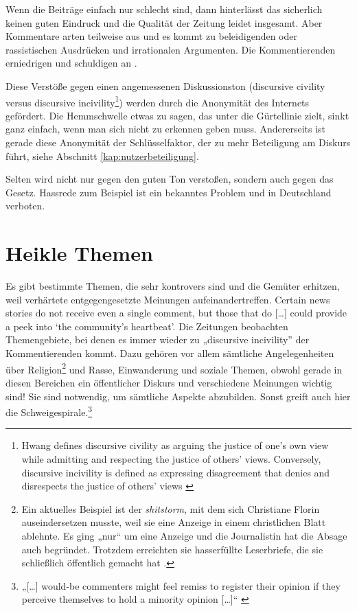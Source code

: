 Wenn die Beiträge einfach nur schlecht sind, dann hinterlässt das sicherlich
keinen guten Eindruck und die Qualität der Zeitung leidet insgesamt. Aber
Kommentare arten teilweise aus und es kommt zu beleidigenden oder rassistischen
Ausdrücken und irrationalen Argumenten. Die Kommentierenden erniedrigen und
schuldigen an \autocite[S.~103]{reich}.

Diese Verstöße gegen einen angemessenen Diskussionston (\glqq discursive
civility\grqq{} versus \glqq discursive incivility\grqq\footnote{Hwang defines
  \glqq discursive civility\grqq{} as arguing the justice of one's own view while
  admitting and respecting the justice of others' views. Conversely,
  \glqq discursive incivility\grqq{} is defined as expressing disagreement that denies
and disrespects the justice of others' views \autocite{hwang}
\autocite[S.~6/7]{santana:2014}}) werden durch die Anonymität des Internets
gefördert. Die Hemmschwelle etwas zu sagen, das unter die Gürtellinie zielt,
sinkt ganz einfach, wenn man sich nicht zu erkennen geben muss. Andererseits ist
gerade diese Anonymität der Schlüsselfaktor, der zu mehr Beteiligung am Diskurs
führt, siehe Abschnitt \ref{kap:nutzerbeteiligung}.

Selten wird nicht nur gegen den guten Ton verstoßen, sondern auch gegen das
Gesetz. Hassrede zum Beispiel ist ein bekanntes Problem und in Deutschland
verboten.


\section{Heikle Themen} \label{abschnitt:themen}

Es gibt bestimmte Themen, die sehr kontrovers sind und die Gemüter erhitzen,
weil verhärtete entgegengesetzte Meinungen aufeinandertreffen. \glqq Certain
news stories do not receive even a single comment, but those that do [\ldots]
could provide a peek into `the community’s heartbeat'.\grqq{}
\autocite[S.~181]{loke} Die Zeitungen beobachten Themengebiete, bei denen es
immer wieder zu „discursive incivility” der Kommentierenden kommt. Dazu gehören
vor allem sämtliche Angelegenheiten über Religion\footnote{Ein aktuelles
Beispiel ist der {\slshape shitstorm}, mit dem sich Christiane Florin
auseindersetzen musste, weil sie eine Anzeige in einem christlichen Blatt
ablehnte. Es ging „nur“ um eine Anzeige und die Journalistin hat die Absage auch
begründet. Trotzdem erreichten sie hasserfüllte Leserbriefe, die sie schließlich
öffentlich gemacht hat \autocite{christundwelt}.} und Rasse, Einwanderung und
soziale Themen, obwohl gerade in diesen Bereichen ein öffentlicher Diskurs und
verschiedene Meinungen wichtig sind! Sie sind notwendig, um sämtliche Aspekte
abzubilden. Sonst greift auch hier die Schweigespirale.\footnote{„[\ldots]
would-be commenters might feel remiss to register their opinion if they perceive
themselves to hold a minority opinion [\ldots]“ \autocite[S.~12]{santana:2014}}

